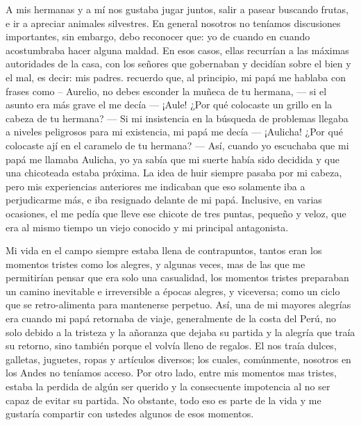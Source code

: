 A mis hermanas y a mí nos gustaba jugar juntos, salir a pasear buscando frutas, e ir a apreciar animales silvestres. En general nosotros no teníamos discusiones importantes, sin embargo, debo reconocer que: yo de cuando en cuando acostumbraba hacer alguna maldad.
En esos casos, ellas recurrían a las máximas autoridades de la casa, con los señores que gobernaban y decidían sobre el bien y el mal, es decir: mis padres. 
recuerdo que, al principio, mi papá me hablaba con frases como -- Aurelio, no debes esconder la muñeca de tu hermana, --- si el asunto era más grave el me decía --- ¡Aule! ¿Por qué colocaste un grillo en la cabeza de tu hermana? --- Si mi insistencia en la búsqueda de problemas llegaba a niveles peligrosos para mi existencia, mi papá me decía --- ¡Aulicha! ¿Por qué colocaste ají en el caramelo de tu hermana? ---
Así, cuando yo escuchaba que mi papá me llamaba Aulicha, yo ya sabía que mi suerte había sido decidida y que una chicoteada estaba próxima. La idea de huir siempre pasaba por mi cabeza, pero mis experiencias anteriores me indicaban que eso solamente iba a perjudicarme más, e iba resignado delante de mi papá. Inclusive, en varias ocasiones, el me pedía que lleve ese chicote de tres puntas, pequeño y veloz, que era al mismo tiempo un viejo conocido y mi principal antagonista. 

Mi vida en el campo siempre estaba llena de contrapuntos, tantos eran los momentos tristes como los alegres, y  algunas veces, mas de las que me permitirían pensar que era solo una casualidad, los momentos tristes preparaban un camino inevitable e irreversible a épocas alegres, y viceversa; como un ciclo que se retro-alimenta para mantenerse perpetuo.
Así, una de mi mayores alegrías era cuando mi papá retornaba de viaje, generalmente de la costa del Perú, no solo debido a la tristeza y la añoranza que dejaba su partida y la alegría que traía su retorno, sino también porque el volvía lleno de regalos. 
El nos traía dulces, galletas, juguetes, ropas y artículos diversos; los cuales, comúnmente, nosotros en los Andes no teníamos acceso.
Por otro lado, entre mis momentos mas tristes, estaba la perdida de algún ser querido y la consecuente impotencia al no ser capaz de evitar su partida.
No obstante, todo eso es parte de la vida y me gustaría compartir con ustedes algunos de esos momentos.





